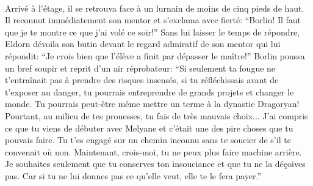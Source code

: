 \paragraph{}
Arrivé à l'étage, il se retrouva face à un lurnain de moins de cinq pieds de
haut. Il reconnut immédiatement son mentor et s'exclama avec fierté: ``Borlin!
Il faut que je te montre ce que j'ai volé ce soir!'' Sans lui laisser le
temps de répondre, Eldorn dévoila son butin devant le regard admiratif de son
mentor qui lui répondit: ``Je crois bien que l'élève a finit par dépasser le
maître!'' Borlin poussa un bref soupir et reprit d'un air réprobateur: ``Si
seulement ta fougue ne t'entraînait pas à prendre des risques insensés, si tu
réfléchissais avant de t'exposer au danger, tu pourrais entreprendre de grands
projets et changer le monde. Tu pourrais peut-être même mettre un terme à la
dynastie Dragoryan! Pourtant, au milieu de tes prouesses, tu fais de très
mauvais choix... J'ai compris ce que tu viens de débuter avec Melyane et
c'était une des pire choses que tu pouvais faire. Tu t'es engagé sur un chemin
inconnu sans te soucier de s'il te convenait où non. Maintenant, crois-moi, tu
ne peux plus faire machine arrière. Je souhaites seulement que tu conserves
ton insouciance et que tu ne la déçoives pas. Car si tu ne lui donnes pas ce
qu'elle veut, elle te le fera payer.''

